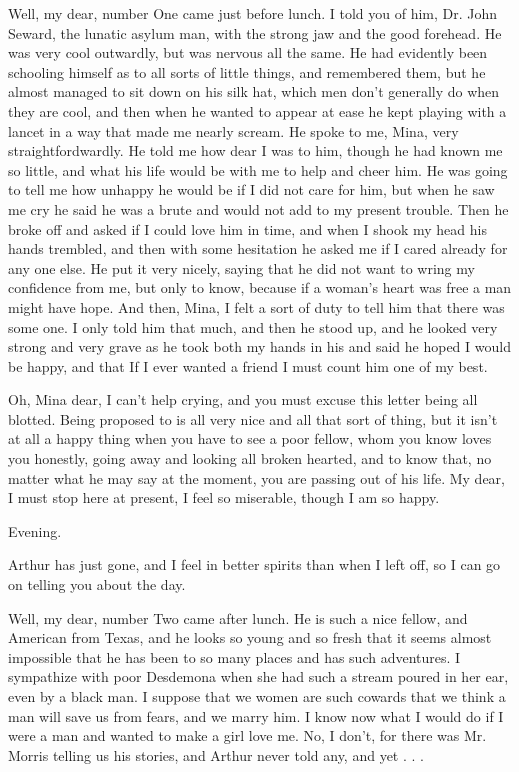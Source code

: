 Well, my dear, number One came just before lunch. I told you of him, Dr. John Seward, the lunatic asylum man, with the strong jaw and the good forehead. He was very cool outwardly, but was nervous all the same. He had evidently been schooling himself as to all sorts of little things, and remembered them, but he almost managed to sit down on his silk hat, which men don't generally do when they are cool, and then when he wanted to appear at ease he kept playing with a lancet in a way that made me nearly scream. He spoke to me, Mina, very straightfordwardly. He told me how dear I was to him, though he had known me so little, and what his life would be with me to help and cheer him. He was going to tell me how unhappy he would be if I did not care for him, but when he saw me cry he said he was a brute and would not add to my present trouble. Then he broke off and asked if I could love him in time, and when I shook my head his hands trembled, and then with some hesitation he asked me if I cared already for any one else. He put it very nicely, saying that he did not want to wring my confidence from me, but only to know, because if a woman's heart was free a man might have hope. And then, Mina, I felt a sort of duty to tell him that there was some one. I only told him that much, and then he stood up, and he looked very strong and very grave as he took both my hands in his and said he hoped I would be happy, and that If I ever wanted a friend I must count him one of my best. 

Oh, Mina dear, I can't help crying, and you must excuse this letter being all blotted. Being proposed to is all very nice and all that sort of thing, but it isn't at all a happy thing when you have to see a poor fellow, whom you know loves you honestly, going away and looking all broken hearted, and to know that, no matter what he may say at the moment, you are passing out of his life. My dear, I must stop here at present, I feel so miserable, though I am so happy. 

Evening. 

Arthur has just gone, and I feel in better spirits than when I left off, so I can go on telling you about the day. 

Well, my dear, number Two came after lunch. He is such a nice fellow, and American from Texas, and he looks so young and so fresh that it seems almost impossible that he has been to so many places and has such adventures. I sympathize with poor Desdemona when she had such a stream poured in her ear, even by a black man. I suppose that we women are such cowards that we think a man will save us from fears, and we marry him. I know now what I would do if I were a man and wanted to make a girl love me. No, I don't, for there was Mr. Morris telling us his stories, and Arthur never told any, and yet . . . 

